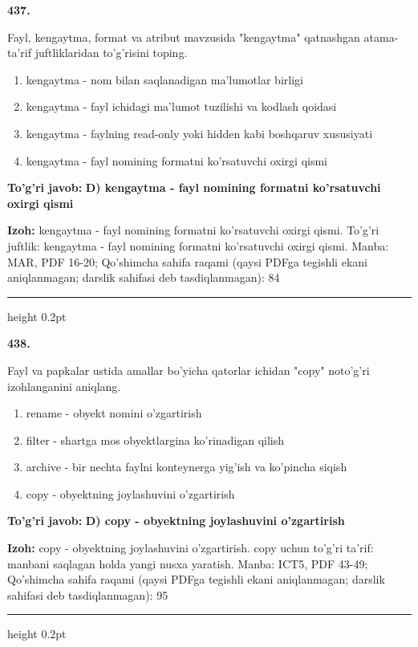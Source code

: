 \documentclass[10pt,a4paper]{article}
\begin{document}
{\bfseries\sffamily\color{ink} 437.}
\par
Fayl, kengaytma, format va atribut mavzusida "kengaytma" qatnashgan atama-ta'rif juftliklaridan to'g'risini toping.
\begin{enumerate}[label=\Alph*),leftmargin=9mm]
\item kengaytma - nom bilan saqlanadigan ma'lumotlar birligi
\item kengaytma - fayl ichidagi ma'lumot tuzilishi va kodlash qoidasi
\item kengaytma - faylning read-only yoki hidden kabi boshqaruv xususiyati
\item kengaytma - fayl nomining formatni ko'rsatuvchi oxirgi qismi
\end{enumerate}
\begin{tcolorbox}[enhanced,breakable,colback=teal!4,colframe=teal!60!black,boxrule=0.45pt,arc=1.2mm,left=2.7mm,right=2.7mm,top=1.8mm,bottom=1.8mm,before skip=2mm,after skip=2mm]
{\bfseries\sffamily\color{teal}To'g'ri javob:} \textbf{D) kengaytma - fayl nomining formatni ko'rsatuvchi oxirgi qismi}
\par\smallskip
{\bfseries Izoh:} kengaytma - fayl nomining formatni ko'rsatuvchi oxirgi qismi. To'g'ri juftlik: kengaytma - fayl nomining formatni ko'rsatuvchi oxirgi qismi. Manba: MAR, PDF 16-20; Qo'shimcha sahifa raqami (qaysi PDFga tegishli ekani aniqlanmagan; darslik sahifasi deb tasdiqlanmagan): 84
\end{tcolorbox}
\vspace{2mm}\hrule height 0.2pt\vspace{3mm}

{\bfseries\sffamily\color{ink} 438.}
\par
Fayl va papkalar ustida amallar bo'yicha qatorlar ichidan "copy" noto'g'ri izohlanganini aniqlang.
\begin{enumerate}[label=\Alph*),leftmargin=9mm]
\item rename - obyekt nomini o'zgartirish
\item filter - shartga mos obyektlargina ko'rinadigan qilish
\item archive - bir nechta faylni konteynerga yig'ish va ko'pincha siqish
\item copy - obyektning joylashuvini o'zgartirish
\end{enumerate}
\begin{tcolorbox}[enhanced,breakable,colback=teal!4,colframe=teal!60!black,boxrule=0.45pt,arc=1.2mm,left=2.7mm,right=2.7mm,top=1.8mm,bottom=1.8mm,before skip=2mm,after skip=2mm]
{\bfseries\sffamily\color{teal}To'g'ri javob:} \textbf{D) copy - obyektning joylashuvini o'zgartirish}
\par\smallskip
{\bfseries Izoh:} copy - obyektning joylashuvini o'zgartirish. copy uchun to'g'ri ta'rif: manbani saqlagan holda yangi nusxa yaratish. Manba: ICT5, PDF 43-49; Qo'shimcha sahifa raqami (qaysi PDFga tegishli ekani aniqlanmagan; darslik sahifasi deb tasdiqlanmagan): 95
\end{tcolorbox}
\vspace{2mm}\hrule height 0.2pt\vspace{3mm}
\end{document}
